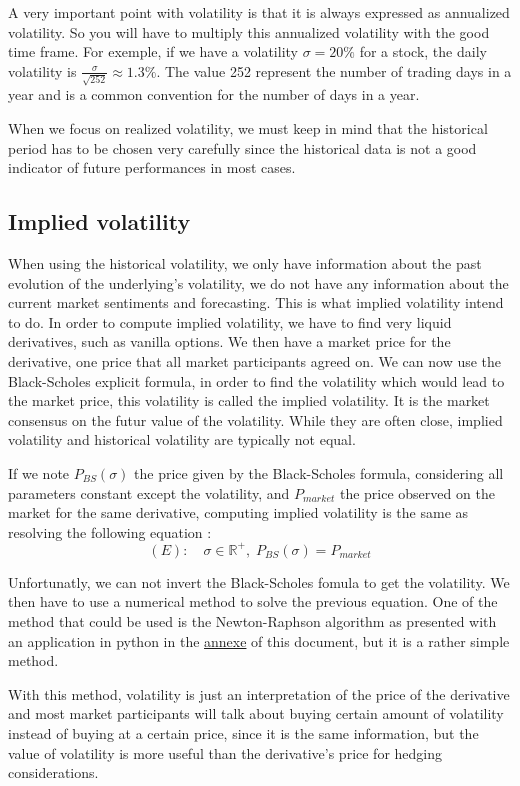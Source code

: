 \documentclass[hidelinks]{article}
\theoremstyle{definition}
\begin{document}
A very important point with volatility is that it is always expressed as annualized volatility. So you will have to multiply this annualized volatility with the good time frame. For exemple, if we have a volatility $\sigma =20\%$ for a stock, the daily volatility is $\frac{\sigma}{\sqrt{252}} \approx 1.3 \%$. The value 252 represent the number of trading days in a year and is a common convention for the number of days in a year.

When we focus on realized volatility, we must keep in mind that the historical period has to be chosen very carefully since the historical data is not a good indicator of future performances in most cases.

\newpage
\subsection{Implied volatility}

When using the historical volatility, we only have information about the past evolution of the underlying's volatility, we do not have any information about the current market sentiments and forecasting. This is what implied volatility intend to do. In order to compute implied volatility, we have to find very liquid derivatives, such as vanilla options. We then have a market price for the derivative, one price that all market participants agreed on. We can now use the Black-Scholes explicit formula, in order to find the volatility which would lead to the market price, this volatility is called the implied volatility. It is the market consensus on the futur value of the volatility. While they are often close, implied volatility and historical volatility are typically not equal. 

If we note $P_{BS}(\sigma)$ the price given by the Black-Scholes formula, considering all parameters constant except the volatility, and $P_{market}$ the price observed on the market for the same derivative, computing implied volatility is the same as resolving the following equation :
$$ (E) : \quad \sigma \in \mathbb{R}^+, \; P_{BS}(\sigma) = P_{market} $$

Unfortunatly, we can not invert the Black-Scholes fomula to get the volatility. We then have to use a numerical method to solve the previous equation. One of the method that could be used is the Newton-Raphson algorithm as presented with an application in python in the \href{sec:iv_calculus}{annexe} of this document, but it is a rather simple method.

With this method, volatility is just an interpretation of the price of the derivative and most market participants will talk about buying certain amount of volatility instead of buying at a certain price, since it is the same information, but the value of volatility is more useful than the derivative's price for hedging considerations.
\end{document}
